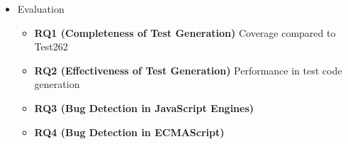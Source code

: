 \begin{itemize}
\item Evaluation
\begin{itemize}
\item {\bf RQ1 (Completeness of Test Generation)}
Coverage compared to Test262
\item {\bf RQ2 (Effectiveness of Test Generation)}
Performance in test code generation
\item {\bf RQ3 (Bug Detection in JavaScript Engines)}
\item {\bf RQ4 (Bug Detection in ECMAScript)}
\end{itemize}
\end{itemize}
